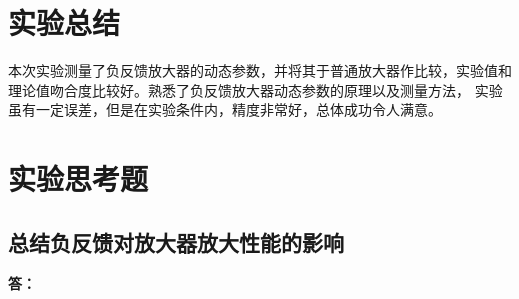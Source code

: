 \documentclass[a4paper,11pt,UTF8]{ctexart}
\newcommand{\np}{\par\noindent}
\begin{document}
\section{实验总结}
本次实验测量了负反馈放大器的动态参数，并将其于普通放大器作比较，实验值和理论值吻合度比较好。熟悉了负反馈放大器动态参数的原理以及测量方法，
实验虽有一定误差，但是在实验条件内，精度非常好，总体成功令人满意。

\section{实验思考题}

\subsection{总结负反馈对放大器放大性能的影响}
\np\textbf{答：}
\end{document}
